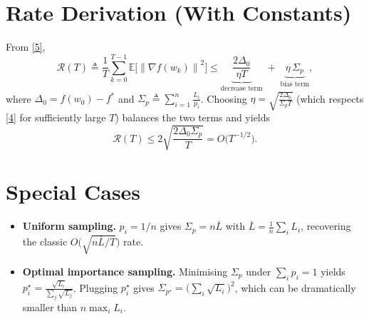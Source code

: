 \documentclass{article}
\newcommand{\EE}{\mathbb{E}}
\newcommand{\norm}[1]{\left\lVert #1\right\rVert}
\begin{document}
\section*{Rate Derivation (With Constants)}
From \eqref{5},
\[
\mathcal{R}(T)\triangleq\frac{1}{T}\sum_{k=0}^{T-1}\EE\!\bigl[\norm{\nabla f(w_k)}^{2}\bigr]
\le \underbrace{\frac{2\Delta_0}{\eta T}}_{\text{decrease term}} 
\;+\;
\underbrace{\eta\,\Sigma_{p}}_{\text{bias term}},
\]
where $\Delta_0=f(w_0)-f^{*}$ and $\Sigma_{p}\triangleq\sum_{i=1}^{n}\frac{L_i}{p_i}$.
Choosing $\eta = \sqrt{\frac{2\Delta_0}{\Sigma_{p}T}}$ (which respects \eqref{4} for sufficiently large $T$) balances the two terms and yields
\[
\mathcal{R}(T)\le 2\sqrt{\frac{2\Delta_0\Sigma_{p}}{T}}=O\!\bigl(T^{-1/2}\bigr).
\]

\section*{Special Cases}
\begin{itemize}
\item \textbf{Uniform sampling.} $p_i=1/n$ gives $\Sigma_{p}=n\bar L$ with $\bar L=\frac{1}{n}\sum_i L_i$, recovering the classic $O\!\bigl(\sqrt{n\bar L/T}\bigr)$ rate.
\item \textbf{Optimal importance sampling.} Minimising $\Sigma_{p}$ under $\sum_i p_i=1$ yields $p_i^{\star}= \frac{\sqrt{L_i}}{\sum_j \sqrt{L_j}}$. Plugging $p_i^{\star}$ gives $\Sigma_{p^{\star}} = \bigl(\sum_i \sqrt{L_i}\bigr)^{2}$, which can be dramatically smaller than $n\max_i L_i$.
\end{itemize}
\end{document}
